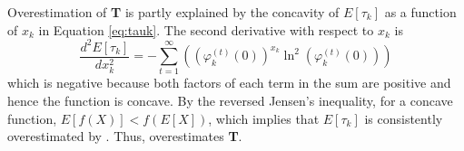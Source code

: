 \documentclass[9pt,lineno]{elife}
\begin{document}
\begin{appendixbox}
Overestimation of \textbf{T} is partly explained by the concavity of $E[\tau_k]$ as a function of $x_k$ in Equation \ref{eq:tauk}. %
The second derivative with respect to $x_k$ is 
\begin{equation*}
\frac{d^2E[\tau_k]}{d x_k^2} = -\sum \limits_{t=1}^\infty\left( \left(\varphi_{k}^{(t)}(0)\right)^{x_{k}}\ln^2\left(\varphi_{k}^{(t)}(0)\right)\right)
\end{equation*}
which is negative because both factors of each term in the sum are positive and hence the function is concave. By the reversed Jensen's inequality, for a concave function, $E[f(X)]<f(E[X])$, which implies that $E[\tau_k]$ is consistently overestimated by .  Thus,  overestimates \textbf{T}. 

\end{appendixbox}
\end{document}

